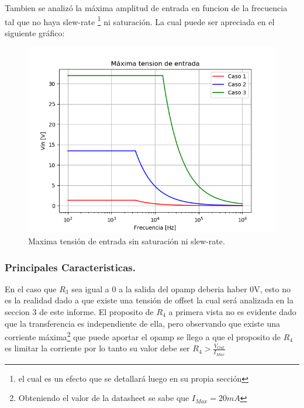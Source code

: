 Tambien se analizó la máxima amplitud de entrada en funcion de la frecuencia tal que no haya slew-rate \footnote{el cual es un efecto que se detallará luego en su propia sección} ni saturación.
La cual puede ser apreciada en el siguiente gráfico:
\begin{figure}[H]	
	\centering
	\includegraphics[width=\textwidth]{Ejercicio1/Imagenes/maxvinsr.png}
	\caption{Maxima tensión de entrada sin saturación ni slew-rate.}
	\label{fig:MaxVinsr}
\end{figure} 
\subsubsection{Principales Caracteristicas.}
En el caso que $R_3$ sea igual a 0 a la salida del opamp deberia haber 0V, esto no es la realidad dado a que existe una tensión de offset la cual será analizada en la seccion 3 de este informe.
El proposito de $R_4$ a primera vista no es evidente dado que la transferencia es independiente de ella, pero observando que existe una corriente máxima\footnote{Obteniendo el valor de la datasheet se sabe que $I_{Max}=20mA$} que puede aportar el opamp se llego a  que el proposito de $R_4$ es limitar la corriente por lo tanto su valor debe ser $R_4>\frac{V_{Out}}{I_{Max}}$ 
